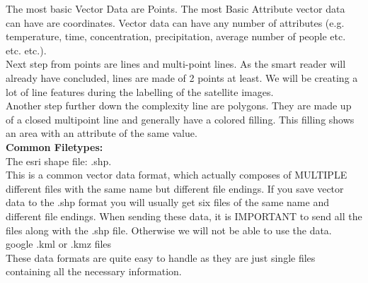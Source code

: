 \documentclass[12pt,a4paper]{scrartcl}
\begin{document}
The most basic Vector Data are Points. The most Basic Attribute vector data can have are coordinates. 
Vector data can have any number of attributes (e.g. temperature, time, concentration, precipitation, average number of people etc. etc. etc.). \\

Next step from points are lines and multi-point lines.
As the smart reader will already have concluded, lines are made of 2 points at least.
We will be creating a lot of line features during the labelling of the satellite images.\\

Another step further down the complexity line are polygons. 
They are made up of a closed multipoint line and generally have a colored filling.
This filling shows an area with an attribute of the same value. \\

\textbf{Common Filetypes:}\\

The esri shape file: .shp. \\
This is a common vector data format, which actually composes of MULTIPLE different files with the same name but different file endings.
If you save vector data to the .shp format you will usually get six files of the same name and different file endings.
When sending these data, it is IMPORTANT to send all the files along with the .shp file. 
Otherwise we will not be able to use the data.\\

google .kml or .kmz files \\
These data formats are quite easy to handle as they are just single files containing all the necessary information.
\end{document}
